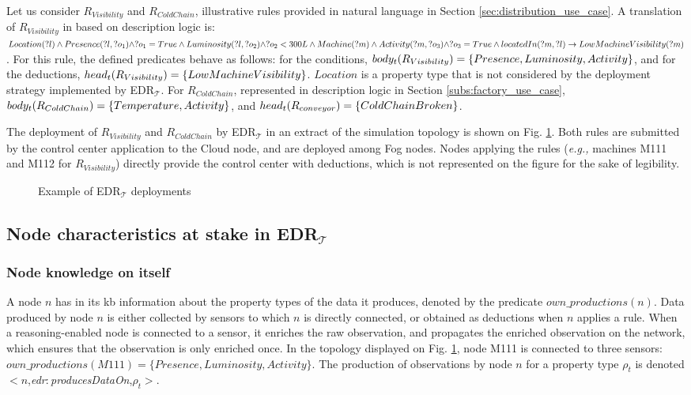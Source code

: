 \documentclass[sw]{iosart2x}
\newcommand{\edrt}{EDR$_{\mathcal{T}}$\xspace}
\newcommand{\namespace}[1]{\textit{#1$:$}}
\newcommand{\concept}[2]{\namespace{#1}\-\textit{#2}}
\newcommand{\triplet}[3]{$<$#1,\textit{#2},#3$>$}
\begin{document}
Let us consider $R_{Visibility}$ and $R_{ColdChain}$, illustrative rules provided in natural language in Section \textsection \ref{sec:distribution_use_case}. 
A translation of $R_{Visibility}$ in based on description logic is: $Lo\-ca\-tion(?l) \land Pre\-sence(?l, ?o_1) \land ?o_1 = True \land Lu\-mi\-no\-si\-ty(?l, ?o_2) \land ?o_2 < 300L \land Ma\-chine(?m) \land Ac\-ti\-vi\-ty(?m, ?o_3) \land ?o_3 = True \land located\-In(?m, ?l) \rightarrow Low\-Machine\-Vi\-si\-bi\-li\-ty(?m)$.
For this rule, the defined predicates behave as follows: for the conditions, $body_t(R_{Visibility})=\{Pre\-sence, Lu\-mi\-no\-si\-ty, Ac\-ti\-vi\-ty\}$, and for the deductions,  $head_t(R_{Visibility})= \{Low\-Ma\-chine\-Vi\-si\-bi\-li\-ty\}$. 
$Location$ is a property type that is not considered by the deployment strategy implemented by \edrt.
For $R_{ColdChain}$, represented in description logic in Section \textsection \ref{subs:factory_use_case}, $body_t(R_{ColdChain})=\{Tem\-pe\-ra\-ture, Ac\-ti\-vi\-ty\}$, and $head_t(R_{conveyor})= \{Cold\-Chain\-Bro\-ken\}$.

The deployment of $R_{Visibility}$ and $R_{ColdChain}$ by \edrt in an extract of the simulation topology is shown on Fig. \ref{fig:edrpt_deployment}.
Both rules are submitted by the control center application to the Cloud node, and are deployed among Fog nodes.
Nodes applying the rules (\textit{e.g.,} machines M111 and M112 for $R_{Visibility}$) directly provide the control center with deductions, which is not represented on the figure for the sake of legibility.

\begin{figure}
	\centering
	\caption{Example of \edrt deployments}
	\label{fig:edrpt_deployment}
	\scalebox{0.8}{
		
	}
\end{figure}

\subsection{Node characteristics at stake in \edrt}
\label{subs:edrt_knowledge}

\subsubsection{Node knowledge on itself}
\label{subsub:self-knowledge}

A node $n$ has in its \gls{kb} information about the property types of the data it produces, denoted by the predicate $own\_productions(n)$.
Data produced by node $n$ is either collected by sensors to which $n$ is directly connected, or obtained as deductions when $n$ applies a rule.
When a reasoning-enabled node is connected to a sensor, it enriches the raw observation, and propagates the enriched observation on the network, which ensures that the observation is only enriched once. 
In the topology displayed on Fig. \ref{fig:edrpt_deployment}, node M111 is connected to three sensors: $own\_productions(M111) = \{Presence, Luminosity, Activity\}$.
The production of observations by node $n$ for a property type $\rho_t$ is denoted \triplet{$n$}{\concept{edr}{produces\-Data\-On}}{$\rho_t$}. 
\end{document}
